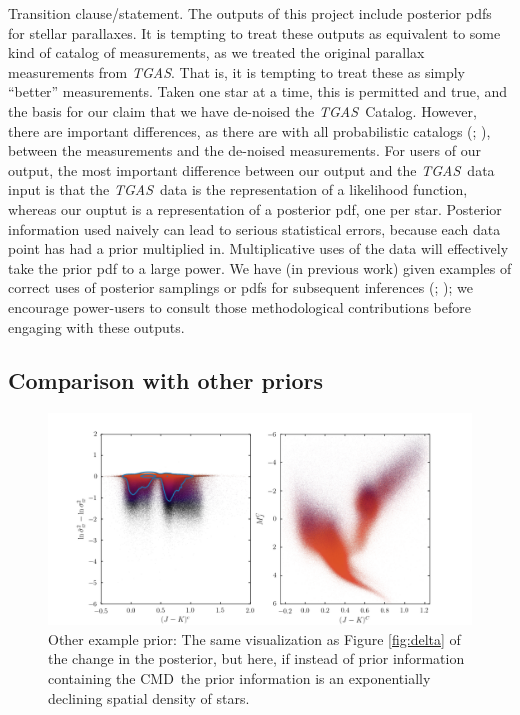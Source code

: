 \documentclass[modern]{aastex61}
\newcommand{\acronym}[1]{{\small{#1}}}
\newcommand{\project}[1]{\textsl{#1}}
\newcommand{\tgas}{\project{\acronym{TGAS}}}
\newcommand{\cmd}{\acronym{CMD}}
\begin{document}
Transition clause/statement. The outputs of this project include posterior pdfs for stellar parallaxes.
It is tempting to treat these outputs as equivalent to some kind of catalog of
measurements, as we treated the original parallax measurements from \tgas.
That is, it is tempting to treat these as simply ``better'' measurements.
Taken one star at a time, this is permitted and true, and the basis for our
claim that we have de-noised the \tgas\ Catalog.
However, there are important differences, as there are with all
probabilistic catalogs (\citealt{hogg11}; \citealt{portillo17}), between the
measurements and the de-noised measurements.
For users of our output, the most important difference between our
output and the \tgas\ data input is that the \tgas\ data is the representation
of a likelihood function, whereas our ouptut is a
representation of a posterior pdf, one per star.
Posterior information used naively can lead to serious statistical
errors, because each data point has had a prior multiplied in.
Multiplicative uses of the data will effectively take the prior
pdf to a large power.
We have (in previous work)
given examples of correct uses of posterior samplings or pdfs
for subsequent inferences (\citealt{hogg08}; \citealt{dfm14}); we
encourage power-users to consult those methodological
contributions before engaging with these outputs. 

\subsection{Comparison with other priors}
\begin{figure}
\centering
  \includegraphics[width=\textwidth]{deltaSimple.png}
\caption{Other example prior: The same visualization as Figure \ref{fig:delta} of the change in the posterior, but here, if instead of prior information containing the \cmd\, the prior information is an exponentially declining spatial density of stars.  }
\label{fig:otherPrior}
\end{figure}
\end{document}

